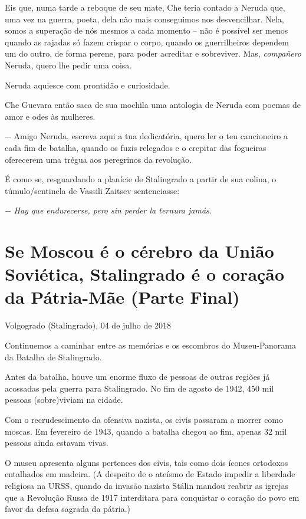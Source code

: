 Eis que, numa tarde a reboque de seu mate, Che teria contado a Neruda
que, uma vez na guerra, poeta, dela não mais conseguimos nos
desvencilhar. Nela, somos a superação de nós mesmos a cada momento --
não é possível ser menos quando as rajadas só fazem crispar o corpo,
quando os guerrilheiros dependem um do outro, de forma perene, para
poder acreditar e sobreviver. Mas, \emph{compañero} Neruda, quero lhe
pedir uma coisa.

Neruda aquiesce com prontidão e curiosidade.

Che Guevara então saca de sua mochila uma antologia de Neruda com poemas
de amor e odes às mulheres.

− Amigo Neruda, escreva aqui a tua dedicatória, quero ler o teu
cancioneiro a cada fim de batalha, quando os fuzis relegados e o
crepitar das fogueiras oferecerem uma trégua aos peregrinos da
revolução.

É como se, resguardando a planície de Stalingrado a partir de sua
colina, o túmulo/sentinela de Vassili Zaitsev sentenciasse:

− \emph{Hay que endurecerse, pero sin perder la ternura jamás.}

\chapter*{Se Moscou é o cérebro da União Soviética, Stalingrado é o coração da Pátria-Mãe (Parte Final)}

\begin{flushright}
Volgogrado (Stalingrado), 04 de julho de 2018
\end{flushright}

Continuemos a caminhar entre as memórias e os escombros do
Museu-Panorama da Batalha de Stalingrado.

Antes da batalha, houve um enorme fluxo de pessoas de outras regiões já
acossadas pela guerra para Stalingrado. No fim de agosto de 1942, 450
mil pessoas (sobre)viviam na cidade.

Com o recrudescimento da ofensiva nazista, os civis passaram a morrer
como moscas. Em fevereiro de 1943, quando a batalha chegou ao fim,
apenas 32 mil pessoas ainda estavam vivas.

O museu apresenta alguns pertences dos civis, tais como dois ícones
ortodoxos entalhados em madeira. (A despeito de o ateísmo de Estado
impedir a liberdade religiosa na URSS, quando da invasão nazista Stálin
mandou reabrir as igrejas que a Revolução Russa de 1917 interditara para
conquistar o coração do povo em favor da defesa sagrada da pátria.)

